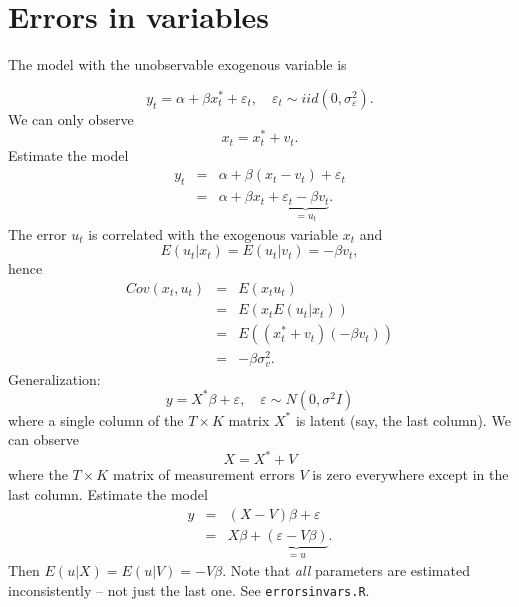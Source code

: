 \documentclass{article}
\begin{document}
\section{Errors in variables}

The model with the unobservable exogenous variable is

\begin{equation*}
y_{t}=\alpha +\beta x_{t}^{\ast }+\varepsilon _{t},\quad \varepsilon
_{t}\sim iid(0,\sigma _{\varepsilon }^{2}).
\end{equation*}%
We can only observe
\begin{equation*}
x_{t}=x_{t}^{\ast }+v_{t}.
\end{equation*}%
Estimate the model%
\begin{eqnarray*}
y_{t} &=&\alpha +\beta \left( x_{t}-v_{t}\right) +\varepsilon _{t} \\
&=&\alpha +\beta x_{t}+\underbrace{\varepsilon _{t}-\beta v_{t}}_{=u_{t}}.
\end{eqnarray*}%
The error $u_{t}$ is correlated with the exogenous variable $x_{t}$ and%
\begin{equation*}
E\left( u_{t}|x_{t}\right) =E\left( u_{t}|v_{t}\right) =-\beta v_{t},
\end{equation*}%
hence%
\begin{eqnarray*}
Cov\left( x_{t},u_{t}\right) &=&E\left( x_{t}u_{t}\right) \\
&=&E\left( x_{t}E\left( u_{t}|x_{t}\right) \right) \\
&=&E\left( \left( x_{t}^{\ast }+v_{t}\right) \left( -\beta v_{t}\right)
\right) \\
&=&-\beta \sigma _{v}^{2}.
\end{eqnarray*}%
Generalization:
\begin{equation*}
y=X^{\ast }\beta +\varepsilon ,\quad \varepsilon \sim N(0,\sigma ^{2}I)
\end{equation*}%
where a single column of the $T\times K$ matrix $X^{\ast }$ is latent (say,
the last column). We can observe%
\begin{equation*}
X=X^{\ast }+V
\end{equation*}%
where the $T\times K$ matrix of measurement errors $V$ is zero everywhere
except in the last column. Estimate the model%
\begin{eqnarray*}
y &=&\left( X-V\right) \beta +\varepsilon \\
&=&X\beta +\underbrace{\left( \varepsilon -V\beta \right) }_{=u}.
\end{eqnarray*}%
Then $E\left( u|X\right) =E\left( u|V\right) =-V\beta $. Note that \emph{all}
parameters are estimated inconsistently -- not just the last one. See
\texttt{errorsinvars.R}.
\end{document}
